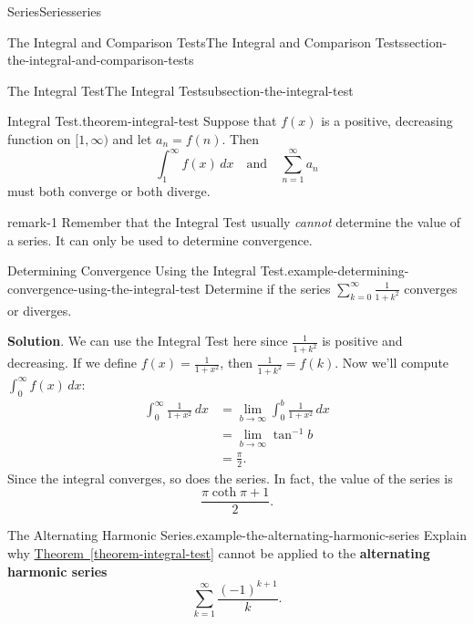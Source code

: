 \documentclass[oneside,10pt,]{book}
\newcommand{\terminology}[1]{\textbf{#1}}
\numberwithin{equation}{section}
\newcommand{\amp}{&}
\begin{document}
\begin{chapterptx}{Series}{}{Series}{}{}{series}
\begin{sectionptx}{The Integral and Comparison Tests}{}{The Integral and Comparison Tests}{}{}{section-the-integral-and-comparison-tests}
\begin{subsectionptx}{The Integral Test}{}{The Integral Test}{}{}{subsection-the-integral-test}
\begin{theorem}{Integral Test.}{}{theorem-integral-test}%
\hypertarget{p-873}{}%
Suppose that \(f(x)\) is a positive, decreasing function on \([1,\infty)\) and let \(a_{n} = f(n)\). Then%
\begin{equation*}
\int_{1}^{\infty}f(x)\,dx\quad\text{and}\quad \sum_{n=1}^{\infty}a_{n}
\end{equation*}
must both converge or both diverge.%
\end{theorem}
\begin{remark}{}{remark-1}%
\hypertarget{p-874}{}%
Remember that the Integral Test usually \emph{cannot} determine the value of a series. It can only be used to determine convergence.%
\end{remark}
\begin{example}{Determining Convergence Using the Integral Test.}{example-determining-convergence-using-the-integral-test}%
\hypertarget{p-875}{}%
Determine if the series \(\sum_{k=0}^{\infty}\frac{1}{1 + k^{2}}\) converges or diverges.%
\par\smallskip%
\noindent\textbf{Solution}.\hypertarget{solution-181}{}\quad%
\hypertarget{p-876}{}%
We can use the Integral Test here since \(\frac{1}{1 + k^{2}}\) is positive and decreasing. If we define \(f(x) = \frac{1}{1 + x^{2}}\), then \(\frac{1}{1 + k^{2}} = f(k)\). Now we'll compute \(\int_{0}^{\infty}f(x)\,dx\):%
\begin{align*}
\int_{0}^{\infty}\frac{1}{1 + x^{2}}\,dx \amp = \lim_{b\to\infty}\int_{0}^{b}\frac{1}{1 + x^{2}}\,dx \\
\amp = \lim_{b\to\infty}\tan^{-1}b \\
\amp = \frac{\pi}{2} \text{.}
\end{align*}
Since the integral converges, so does the series. In fact, the value of the series is%
\begin{equation*}
\frac{\pi\coth\pi + 1}{2}\text{.}
\end{equation*}
%
\end{example}
\begin{example}{The Alternating Harmonic Series.}{example-the-alternating-harmonic-series}%
\hypertarget{p-877}{}%
Explain why \hyperref[theorem-integral-test]{Theorem~\ref{theorem-integral-test}} cannot be applied to the \terminology{alternating harmonic series}%
\begin{equation*}
\sum_{k=1}^{\infty}\frac{(-1)^{k + 1}}{k}\text{.}
\end{equation*}
%
\par\smallskip%

\end{example}
\end{subsectionptx}
\end{sectionptx}
\end{chapterptx}
\end{document}
